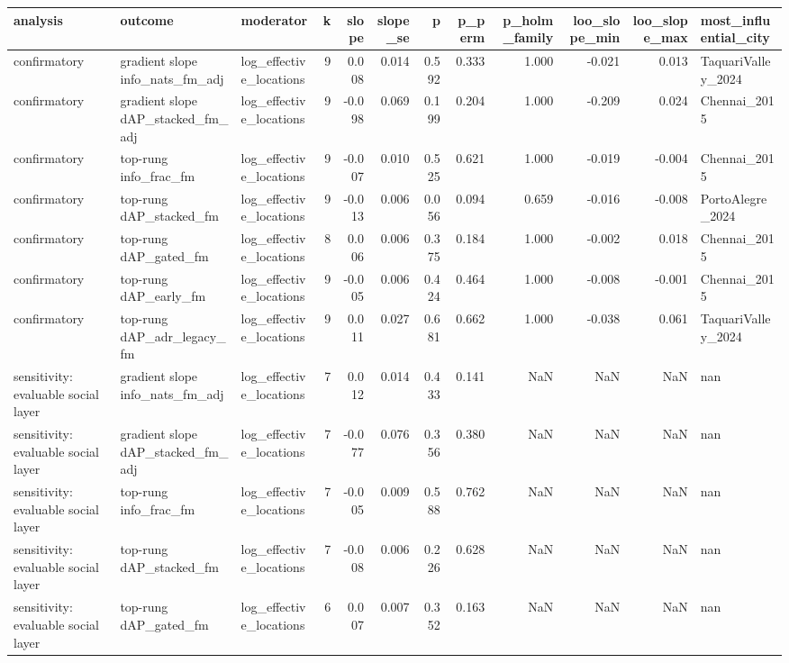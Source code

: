 \begin{tabular}{lllrrrrrrrrl}
\toprule
analysis & outcome & moderator & k & slope & slope_se & p & p_perm & p_holm_family & loo_slope_min & loo_slope_max & most_influential_city \\
\midrule
confirmatory & gradient slope info\_nats\_fm\_adj & log\_effective\_locations & 9 & 0.008 & 0.014 & 0.592 & 0.333 & 1.000 & -0.021 & 0.013 & TaquariValley\_2024 \\
confirmatory & gradient slope dAP\_stacked\_fm\_adj & log\_effective\_locations & 9 & -0.098 & 0.069 & 0.199 & 0.204 & 1.000 & -0.209 & 0.024 & Chennai\_2015 \\
confirmatory & top-rung info\_frac\_fm & log\_effective\_locations & 9 & -0.007 & 0.010 & 0.525 & 0.621 & 1.000 & -0.019 & -0.004 & Chennai\_2015 \\
confirmatory & top-rung dAP\_stacked\_fm & log\_effective\_locations & 9 & -0.013 & 0.006 & 0.056 & 0.094 & 0.659 & -0.016 & -0.008 & PortoAlegre\_2024 \\
confirmatory & top-rung dAP\_gated\_fm & log\_effective\_locations & 8 & 0.006 & 0.006 & 0.375 & 0.184 & 1.000 & -0.002 & 0.018 & Chennai\_2015 \\
confirmatory & top-rung dAP\_early\_fm & log\_effective\_locations & 9 & -0.005 & 0.006 & 0.424 & 0.464 & 1.000 & -0.008 & -0.001 & Chennai\_2015 \\
confirmatory & top-rung dAP\_adr\_legacy\_fm & log\_effective\_locations & 9 & 0.011 & 0.027 & 0.681 & 0.662 & 1.000 & -0.038 & 0.061 & TaquariValley\_2024 \\
sensitivity: evaluable social layer & gradient slope info\_nats\_fm\_adj & log\_effective\_locations & 7 & 0.012 & 0.014 & 0.433 & 0.141 & NaN & NaN & NaN & nan \\
sensitivity: evaluable social layer & gradient slope dAP\_stacked\_fm\_adj & log\_effective\_locations & 7 & -0.077 & 0.076 & 0.356 & 0.380 & NaN & NaN & NaN & nan \\
sensitivity: evaluable social layer & top-rung info\_frac\_fm & log\_effective\_locations & 7 & -0.005 & 0.009 & 0.588 & 0.762 & NaN & NaN & NaN & nan \\
sensitivity: evaluable social layer & top-rung dAP\_stacked\_fm & log\_effective\_locations & 7 & -0.008 & 0.006 & 0.226 & 0.628 & NaN & NaN & NaN & nan \\
sensitivity: evaluable social layer & top-rung dAP\_gated\_fm & log\_effective\_locations & 6 & 0.007 & 0.007 & 0.352 & 0.163 & NaN & NaN & NaN & nan \\

\end{tabular}
